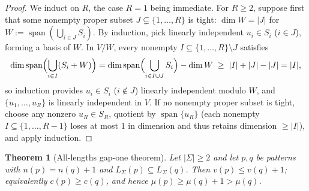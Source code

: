 \documentclass[11pt]{article}
\theoremstyle{plain}
\newtheorem{theorem}{Theorem}
\theoremstyle{definition}
\theoremstyle{remark}
\DeclareMathOperator{\spn}{span}
\begin{document}
\begin{proof}
We induct on $R$, the case $R = 1$ being immediate.
For $R \ge 2$, suppose first that some nonempty proper subset $J \subsetneq \{1, \dots, R\}$ is tight: $\dim W = |J|$ for $W := \spn(\bigcup_{i \in J} S_i)$.
By induction, pick linearly independent $u_i \in S_i$ ($i \in J$), forming a basis of $W$.
In $V/W$, every nonempty $I \subseteq \{1, \dots, R\} \setminus J$ satisfies
\[
\dim\spn\Bigl(\bigcup_{i \in I} (S_i + W)\Bigr) = \dim\spn\Bigl(\bigcup_{i \in I \cup J} S_i\Bigr) - \dim W \;\ge\; |I| + |J| - |J| = |I|,
\]
so induction provides $u_i \in S_i$ ($i \notin J$) linearly independent modulo $W$, and $\{u_1, \dots, u_R\}$ is linearly independent in $V$.
If no nonempty proper subset is tight, choose any nonzero $u_R \in S_R$, quotient by $\spn\{u_R\}$ (each nonempty $I \subseteq \{1, \dots, R-1\}$ loses at most $1$ in dimension and thus retains dimension $\ge |I|$), and apply induction.
\end{proof}

\begin{theorem}[All-lengths gap-one theorem]\label{thm:gap1}
Let $|\Sigma| \ge 2$ and let $p, q$ be patterns with $n(p) = n(q) + 1$ and $L_\Sigma(p) \subseteq L_\Sigma(q)$. Then $v(p) \le v(q) + 1$; equivalently $c(p) \ge c(q)$, and hence $\mu(p) \ge \mu(q) + 1 > \mu(q)$.
\end{theorem}
\end{document}
